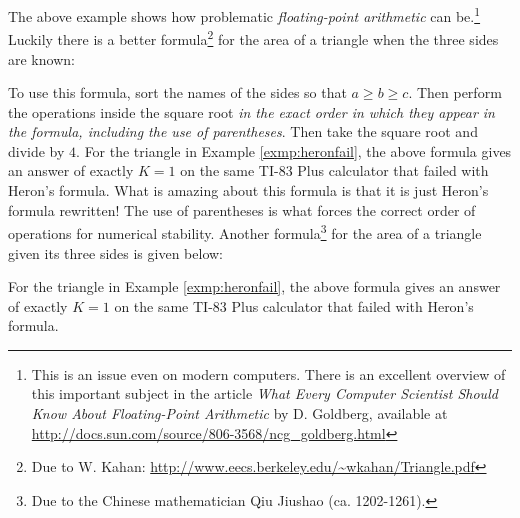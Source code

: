 The above example shows how problematic \emph{floating-point arithmetic} can be.\footnote{This is
an issue even on modern computers. There is an
excellent overview of this important subject in the article \emph{What Every Computer
Scientist Should Know About Floating-Point Arithmetic} by D. Goldberg, available at
\url{http://docs.sun.com/source/806-3568/ncg_goldberg.html}} Luckily there is a better
formula\footnote{Due to W. Kahan: \url{http://www.eecs.berkeley.edu/~wkahan/Triangle.pdf}} for
the area of a triangle when the three sides are known:

\begin{center}\end{center}

To use this formula, sort the names of the sides so that
$a \ge b \ge c$. Then perform the operations inside the square root \emph{in the exact order in
which they appear in the formula, including the use of parentheses}. Then take the square root and
divide by $4$. For the triangle in Example \ref{exmp:heronfail}, the above formula gives an
answer of exactly $K = 1$ on the same TI-83 Plus calculator that failed with Heron's
formula.
What is amazing about this formula is that it is just Heron's formula rewritten! The use of
parentheses is what forces the correct order of operations for numerical stability.
\newpage
Another formula\footnote{Due to the Chinese mathematician Qiu Jiushao (ca. 1202-1261).} for the
area of a triangle given its three sides is given below:

\begin{center}\end{center}

For the triangle in Example \ref{exmp:heronfail}, the above formula gives an answer of
exactly $K = 1$ on the same TI-83 Plus calculator that failed with Heron's formula.

\divider
\vspace{2mm}

